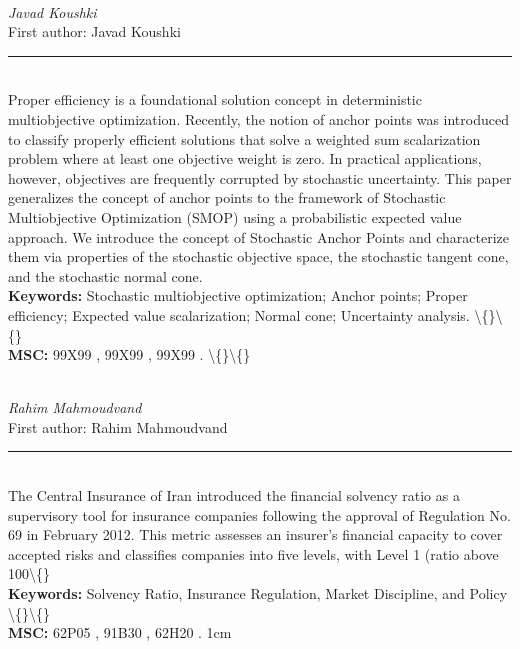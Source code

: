 \documentclass[10pt,twoside]{article}
\begin{document}
\noindent\begin{minipage}[t][\textheight]{\textwidth}
\\[0.35em]
{\itshape Javad Koushki}\\[0.2em]
{\footnotesize First author: Javad Koushki}\\[0.45em]
\noindent\rule{\textwidth}{0.3pt}\\[0.4em]
{\footnotesize  Proper efficiency is a foundational solution concept in deterministic multiobjective optimization. Recently, the notion of anchor points was introduced to classify properly efficient solutions that solve a weighted sum scalarization problem where at least one objective weight is zero. In practical applications, however, objectives are frequently corrupted by stochastic uncertainty. This paper generalizes the concept of anchor points to the framework of Stochastic Multiobjective Optimization (SMOP) using a probabilistic expected value approach. We introduce the concept of Stochastic Anchor Points and characterize them via properties of the stochastic objective space, the stochastic tangent cone, and the stochastic normal cone.}\\[0.4em]
{\footnotesize\bfseries Keywords:} {\footnotesize Stochastic multiobjective optimization; Anchor points; Proper efficiency; Expected value scalarization; Normal cone; Uncertainty analysis. \textbackslash\{\}\textbackslash\{\}}\\[0.15em]
{\footnotesize\bfseries MSC:} {\footnotesize 99X99 , 99X99 , 99X99 . \textbackslash\{\}\textbackslash\{\}}\\
\vfill
\end{minipage}
\newpage

\noindent\begin{minipage}[t][\textheight]{\textwidth}
\\[0.35em]
{\itshape Rahim Mahmoudvand}\\[0.2em]
{\footnotesize First author: Rahim Mahmoudvand}\\[0.45em]
\noindent\rule{\textwidth}{0.3pt}\\[0.4em]
{\footnotesize  The Central Insurance of Iran introduced the financial solvency ratio as a supervisory tool for insurance companies following the approval of Regulation No. 69 in February 2012. This metric assesses an insurer's financial capacity to cover accepted risks and classifies companies into five levels, with Level 1 (ratio above 100\textbackslash\{\}}\\[0.4em]
{\footnotesize\bfseries Keywords:} {\footnotesize Solvency Ratio, Insurance Regulation, Market Discipline, and Policy \textbackslash\{\}\textbackslash\{\}}\\[0.15em]
{\footnotesize\bfseries MSC:} {\footnotesize 62P05 , 91B30 , 62H20 . 1cm}\\
\vfill
\end{minipage}
\newpage
\end{document}
